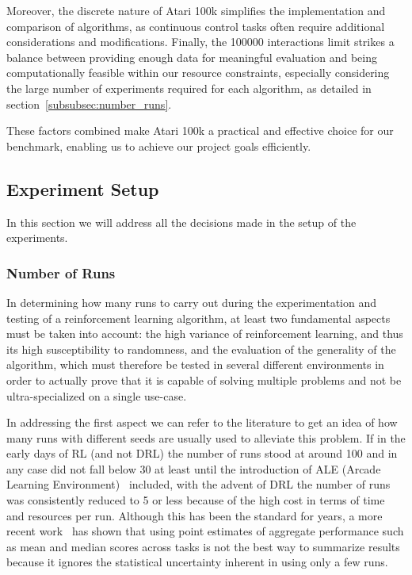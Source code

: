 Moreover, the discrete nature of Atari 100k simplifies the implementation and comparison of algorithms, as continuous control tasks often require additional considerations and modifications. Finally, the \num{100000} interactions limit strikes a balance between providing enough data for meaningful evaluation and being computationally feasible within our resource constraints, especially considering the large number of experiments required for each algorithm, as detailed in section~\vref{subsubsec:number_runs}.

These factors combined make Atari 100k a practical and effective choice for our benchmark, enabling us to achieve our project goals efficiently.


\subsection{Experiment Setup}
\label{subsec:experiment_setup}
In this section we will address all the decisions made in the setup of the experiments.

\subsubsection{Number of Runs}
\label{subsubsec:number_runs}

In determining how many runs to carry out during the experimentation and testing of a reinforcement learning algorithm, at least two fundamental aspects must be taken into account: the high variance of reinforcement learning, and thus its high susceptibility to randomness, and the evaluation of the generality of the algorithm, which must therefore be tested in several different environments in order to actually prove that it is capable of solving multiple problems and not be ultra-specialized on a single use-case.

In addressing the first aspect we can refer to the literature to get an idea of how many runs with different seeds are usually used to alleviate this problem. If in the early days of RL (and not DRL) the number of runs stood at around 100 and in any case did not fall below 30 at least until the introduction of ALE (Arcade Learning Environment)~\cite{bellemare:ale} included, with the advent of DRL the number of runs was consistently reduced to 5 or less because of the high cost in terms of time and resources per run. Although this has been the standard for years, a more recent work~\cite{agarwal:statistical_precipice} has shown that using point estimates of aggregate performance such as mean and median scores across tasks is not the best way to summarize results because it ignores the statistical uncertainty inherent in using only a few runs.

